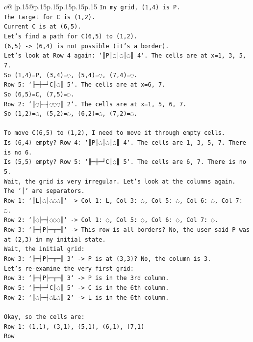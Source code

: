 \documentclass{article}
\begin{document}
{\begin{supertabular}{c@{$\;$}|p{.15\linewidth}@{}p{.15\linewidth}p{.15\linewidth}p{.15\linewidth}p{.15\linewidth}p{.15\linewidth}}
{{{\texttt{In my grid, (1,4) is P.} \\
\texttt{The target for C is (1,2).} \\
\texttt{Current C is at (6,5).} \\
\texttt{Let's find a path for C(6,5) to (1,2).} \\
\texttt{(6,5) {-}> (6,4) is not possible (it's a border).} \\
\texttt{Let's look at Row 4 again: `║P│◌│◌│◌║ 4`. The cells are at x=1, 3, 5, 7.} \\
\texttt{So (1,4)=P, (3,4)=◌, (5,4)=◌, (7,4)=◌.} \\
\texttt{Row 5: `╟─┼─┘C│◌║ 5`. The cells are at x=6, 7.} \\
\texttt{So (6,5)=C, (7,5)=◌.} \\
\texttt{Row 2: `║◌├─┤◌◌◌║ 2`. The cells are at x=1, 5, 6, 7.} \\
\texttt{So (1,2)=◌, (5,2)=◌, (6,2)=◌, (7,2)=◌.} \\
\\ 
\texttt{To move C(6,5) to (1,2), I need to move it through empty cells.} \\
\texttt{Is (6,4) empty? Row 4: `║P│◌│◌│◌║ 4`. The cells are 1, 3, 5, 7. There is no 6.} \\
\texttt{Is (5,5) empty? Row 5: `╟─┼─┘C│◌║ 5`. The cells are 6, 7. There is no 5.} \\
\texttt{Wait, the grid is very irregular. Let's look at the columns again.} \\
\texttt{The `│` are separators.} \\
\texttt{Row 1: `║L│◌│◌◌◌║` {-}> Col 1: L, Col 3: ◌, Col 5: ◌, Col 6: ◌, Col 7: ◌.} \\
\texttt{Row 2: `║◌├─┤◌◌◌║` {-}> Col 1: ◌, Col 5: ◌, Col 6: ◌, Col 7: ◌.} \\
\texttt{Row 3: `╟─┤P├─┬─╢` {-}> This row is all borders? No, the user said P was at (2,3) in my initial state.} \\
\texttt{Wait, the initial grid:} \\
\texttt{Row 3: `╟─┤P├─┬─╢ 3` {-}> P is at (3,3)? No, the column is 3.} \\
\texttt{Let's re{-}examine the very first grid:} \\
\texttt{Row 3: `╟─┤P├─┬─╢ 3` {-}> P is in the 3rd column.} \\
\texttt{Row 5: `╟─┼─┘C│◌║ 5` {-}> C is in the 6th column.} \\
\texttt{Row 2: `║◌├─┤◌L◌║ 2` {-}> L is in the 6th column.} \\
\\ 
\texttt{Okay, so the cells are:} \\
\texttt{Row 1: (1,1), (3,1), (5,1), (6,1), (7,1)} \\
\texttt{Row} \\
            }
        }
    }
     \\ \\


\end{supertabular}}
\end{document}
